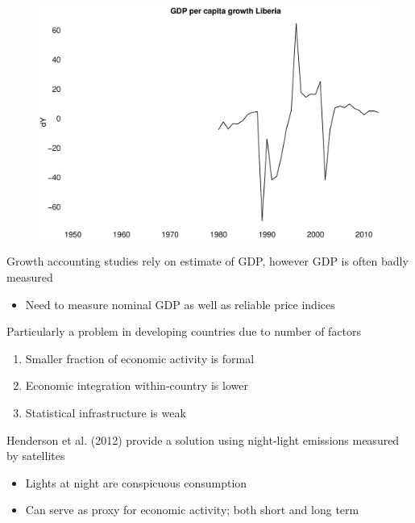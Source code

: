 \documentclass{beamer}
\begin{document}
\begin{frame}
  \begin{figure}
    \includegraphics[scale=.3]{liberia.eps}
  \end{figure}
\end{frame}

\begin{frame}
  Growth accounting studies rely on estimate of GDP, however GDP is often badly measured
  \begin{itemize}
    \item Need to measure nominal GDP as well as reliable price indices
  \end{itemize}
  \medskip
  Particularly a problem in developing countries due to number of factors
  \begin{enumerate}
    \item Smaller fraction of economic activity is formal
    \item Economic integration within-country is lower
    \item Statistical infrastructure is weak
  \end{enumerate}
\end{frame}

\begin{frame}
  Henderson et al. (2012) provide a solution using night-light emissions measured by satellites
  \begin{itemize}
    \item Lights at night are conspicuous consumption
    \item Can serve as proxy for economic activity; both short and long term
  \end{itemize}
\end{frame}
\end{document}
